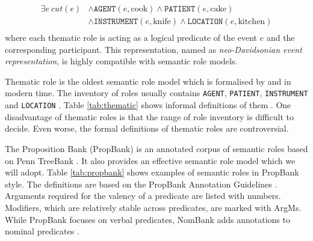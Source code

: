 \documentclass[a4paper]{article}
\begin{document}
\begin{equation} \label{eg:neodavidsonian}
\begin{aligned}
    \exists e\ cut(e)
    & \land \texttt{AGENT}(e, \text{cook}) \land \texttt{PATIENT}(e, \text{cake}) \\
    & \land \texttt{INSTRUMENT}(e, \text{knife}) \land \texttt{LOCATION}(e, \text{kitchen}) \\
\end{aligned}
\end{equation}
where each thematic role is acting as a logical predicate of the event $e$ and the corresponding participant. This representation, named as \textit{neo-Davidsonian event representation}, is highly compatible with semantic role models. 
% 
% 

Thematic role is the oldest semantic role model which is formalised by \citet{gruber1965studies} and \citet{fillmore1968case} in modern time. The inventory of roles usually contains \texttt{AGENT}, \texttt{PATIENT}, \texttt{INSTRUMENT} and \texttt{LOCATION} \citep{aarts2013english}. Table \ref{tab:thematic} shows informal definitions of them \citep{jurafsky2014speech}. One disadvantage of thematic roles is that the range of role inventory is difficult to decide. Even worse, the formal definitions of thematic roles are controversial. 

The Proposition Bank (PropBank) is an annotated corpus of semantic roles based on Penn TreeBank \citep{palmer2005proposition}. It also provides an effective semantic role model which we will adopt. Table \ref{tab:propbank} shows examples of semantic roles in PropBank style. The definitions are based on the PropBank Annotation Guidelines \citep{bonial2010propbank}. Arguments required for the valency of a predicate are listed with numbers. Modifiers, which are relatively stable across predicates, are marked with ArgMs. While PropBank focuses on verbal predicates, NomBank adds annotations to nominal predicates \citep{meyers2004nombank}. 
\end{document}
